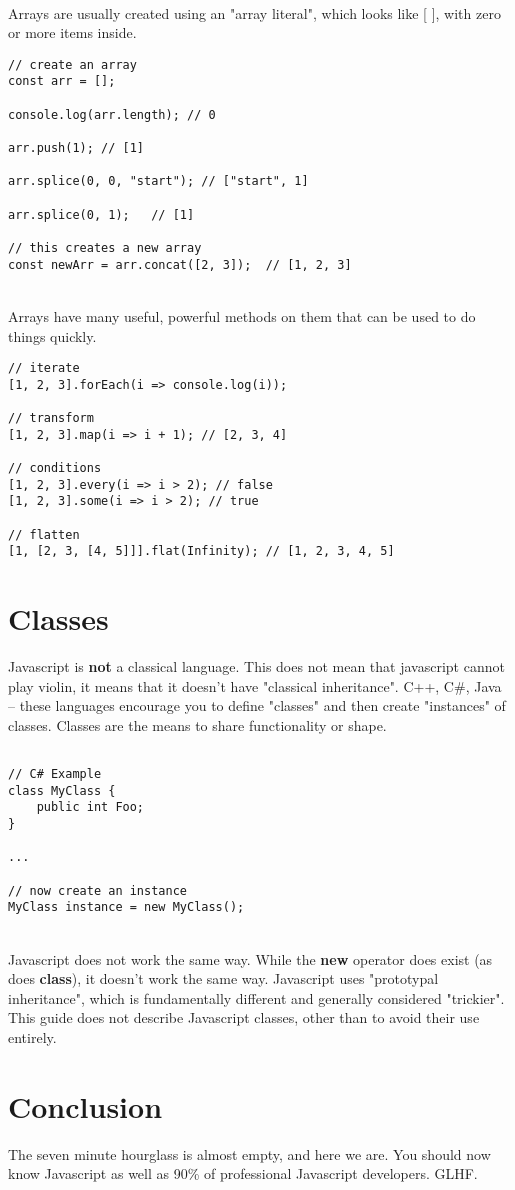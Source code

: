\documentclass{article}
\begin{document}
\noindent
\\
Arrays are usually created using an "array literal", which looks like [ ], with zero or more items inside.
\\

\begin{lstlisting}
// create an array
const arr = [];

console.log(arr.length); // 0

arr.push(1); // [1]

arr.splice(0, 0, "start"); // ["start", 1]

arr.splice(0, 1);	// [1]

// this creates a new array
const newArr = arr.concat([2, 3]);	// [1, 2, 3]

\end{lstlisting}

\noindent
\\
Arrays have many useful, powerful methods on them that can be used to do things quickly.

\begin{lstlisting}
// iterate
[1, 2, 3].forEach(i => console.log(i));

// transform
[1, 2, 3].map(i => i + 1); // [2, 3, 4]

// conditions
[1, 2, 3].every(i => i > 2); // false
[1, 2, 3].some(i => i > 2); // true

// flatten
[1, [2, 3, [4, 5]]].flat(Infinity); // [1, 2, 3, 4, 5]
\end{lstlisting}

\section{Classes}

Javascript is \textbf{not} a classical language. This does not mean that javascript cannot play violin, it means that it doesn't have "classical inheritance". C++, C\#, Java -- these languages encourage you to define "classes" and then create "instances" of classes. Classes are the means to share functionality or shape.

\begin{lstlisting}

// C# Example
class MyClass {
	public int Foo;
}

...

// now create an instance
MyClass instance = new MyClass();
\end{lstlisting}

\noindent
\\
Javascript does not work the same way. While the \textbf{new} operator does exist (as does \textbf{class}), it doesn't work the same way. Javascript uses "prototypal inheritance", which is fundamentally different and generally considered "trickier". This guide does not describe Javascript classes, other than to avoid their use entirely.

\section{Conclusion}

The seven minute hourglass is almost empty, and here we are. You should now know Javascript as well as 90\% of professional Javascript developers. GLHF.
\end{document}
